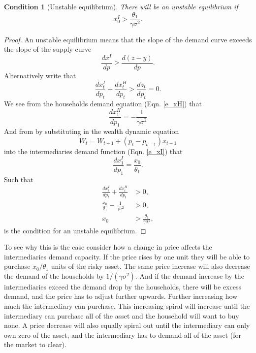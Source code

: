\documentclass[11pt]{article}
\newtheorem{condition}{Condition}
\begin{document}
\begin{appendices}
\begin{condition}[Unstable equilibrium] \label{c_unstable} 
There will be an unstable equilibrium if
\begin{equation}
x_0^I > \frac{\theta_1}{\gamma \sigma^2}.
\end{equation}
\end{condition}
\begin{proof}
An unstable equilibrium means that the slope of the demand curve exceeds the slope of the supply curve
\begin{equation*}
\frac{d x^I}{dp} > \frac{ d (z-y)}{dp}.
\end{equation*}
Alternatively write that 
\begin{equation*}
\frac{d x^I_t}{dp_t} + \frac{d x^H_t}{dp_t} > \frac{dz_t}{dp_t} = 0.
\end{equation*}
We see from the households demand equation (Eqn. \ref{e_xH}) that 
\begin{equation*}
\frac{d x^H_1}{dp_1} = -\frac{1}{\gamma \sigma^2}
\end{equation*}
And from by substituting in the wealth dynamic equation
\begin{equation}
W_{t} = W_{t-1} + (p_{t}-p_{t-1})x_{t-1}
\end{equation}
into the intermediaries demand function (Eqn. \ref{e_xI}) that
\begin{equation*}
\frac{d x^I_1}{dp_1} = \frac{x_0}{\theta_1}.
\end{equation*}
Such that
\begin{align*}
\frac{d x^I_t}{dp_t} + \frac{d x^H_t}{dp_t} &> 0,\\
\frac{x_0}{\theta_1} - \frac{1}{\gamma \sigma^2} &> 0,\\
x_0 &> \frac{\theta_1}{\gamma \sigma^2},
\end{align*}
is the condition for an unstable equilibrium.
\end{proof}

To see why this is the case consider how a change in price affects the intermediaries demand capacity. If the price rises by one unit they will be able to purchase $x_0/\theta_1$ units of the risky asset. The same price increase will also decrease the demand of the households by $1/(\gamma \sigma^2)$. And if the demand increase by the intermediaries exceed the demand drop by the households, there will be excess demand, and the price has to adjust further upwards. Further increasing how much the intermediary can purchase. This increasing spiral will increase until the intermediary can purchase all of the asset and the household will want to buy none. A price decrease will also equally spiral out until the intermediary can only own zero of the asset, and the intermediary has to demand all of the asset (for the market to clear). 



\end{appendices}
\end{document}
